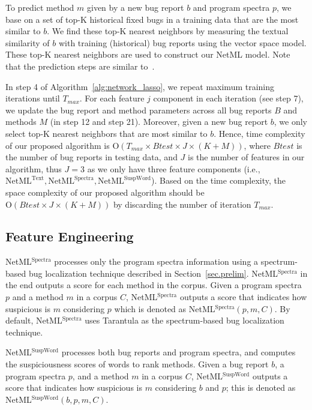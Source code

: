To predict method $m$ given by a new bug report $b$ and program spectra $p$, we base on a set of top-K historical fixed bugs in a training data that are the most similar to $b$. We find these top-K nearest neighbors by measuring the textual similarity of $b$ with training (historical) bug reports using the vector space model. These top-K nearest neighbors are used to construct our NetML model. Note that the prediction steps are similar to~\cite{Le:2015:IRS:2786805.2786880}.

In step 4 of Algorithm~\ref{alg:network_lasso}, we repeat maximum training iterations until $T_{max}$. For each feature $j$ component in each iteration (see step 7), we update the bug report and method parameters across all bug reports $B$ and methods $M$ (in step 12 and step 21). Moreover, given a new bug report $b$, we only select top-K nearest neighbors that are most similar to $b$. Hence, time complexity of our proposed algorithm is $\text{O}(T_{max} \times Btest \times J \times (K + M))$, where $Btest$ is the number of bug reports in testing data, and $J$ is the number of features in our algorithm, thus $J = 3$ as we only have three feature components (i.e., $\text{NetML}^{\text{Text}}, \text{NetML}^{\text{Spectra}}, \text{NetML}^{\text{SuspWord}}$). Based on the time complexity, the space complexity of our proposed algorithm should be $\text{O}(Btest \times J \times (K + M))$ by discarding the number of iteration $T_{max}$.


\subsection{Feature Engineering}\label{subsec:both}

NetML$^\text{Spectra}$ processes only the program spectra information using a spectrum-based bug localization technique described in Section~\ref{sec.prelim}. NetML$^\text{Spectra}$ in the end outputs a score for each method in the corpus. Given a program spectra $p$ and a method $m$ in a corpus $C$, NetML$^\text{Spectra}$ outputs a score that indicates how suspicious is $m$ considering $p$ which is denoted as NetML$^\text{Spectra}(p,m,C)$. By default, NetML$^\text{Spectra}$ uses Tarantula as the spectrum-based bug localization technique.

NetML$^\text{SuspWord}$ processes both bug reports and program spectra, and computes the suspiciousness scores of words to rank methods. Given a bug report $b$, a program spectra $p$, and a method $m$ in a corpus $C$, NetML$^\text{SuspWord}$ outputs a score that indicates how suspicious is $m$ considering $b$ and $p$; this is denoted as NetML$^\text{SuspWord}(b,p,m,C)$. 

